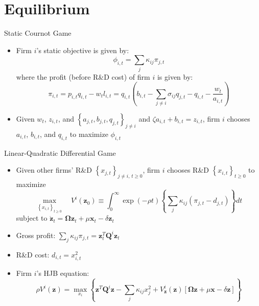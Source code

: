\documentclass[
  10pt,
  aspectratio=169,   %
]{beamer}
\theoremstyle{plain}
\begin{document}
\section{Equilibrium}

\begin{frame}{Static Cournot Game}
  \label{static_game}
  \begin{itemize}
    \item Firm $i$'s static objective is given by:
          \[
            \phi_{i,t} = \sum_{j} \kappa_{ij} \pi_{j,t}
          \]
          where the profit (before R\&D cost) of firm $i$ is given by:
          \[\pi_{i,t} = p_{i,t} q_{i,t} - w_t l_{i,t} = q_{i,t} \left( b_{i,t} - \sum_{j\neq i} \sigma_{ij} q_{j,t} - q_{i,t} - \frac{w_t}{a_{i,t}} \right)\]
    \item Given $w_t$, $z_{i,t}$, and $\left\{a_{j,t}, b_{j,t}, q_{j,t}\right\}_{j\neq i}$ and $\zeta a_{i,t} + b_{i,t} = z_{i,t}$, firm $i$ chooses $a_{i,t}$, $b_{i,t}$, and $q_{i,t}$ to maximize $\phi_{i,t}$
  \end{itemize}
  \hyperlink{static_equilibrium}{}
\end{frame}

\begin{frame}{Linear-Quadratic Differential Game}
  \begin{itemize}
    \item Given other firms' R\&D $\left\{ x_{j,t}\right\}_{j\neq i,\,t\geq0}$, firm $i$ chooses R\&D $\left\{ x_{i,t}\right\}_{t\geq0}$ to maximize
          \[
            \max_{\left\{ x_{i,t}\right\}_{t\geq0}}\quad V^{i}\left(\bm{z}_{0}\right)\equiv\int_{0}^{\infty}\exp\left(-\rho t\right)\left\{ \sum_{j}\kappa_{ij}\left(\pi_{j,t}-d_{j,t}\right)\right\} dt
          \]
          subject to $\dot{\bm{z}}_{t}=\bm{\Omega}\bm{z}_{t}+\mu\bm{x}_{t}-\delta\bm{z}_{t}$
          \pause\medskip{}
    \item Gross profit: $\sum_{j}\kappa_{ij}\pi_{j,t}=\bm{z}_{t}^{T}\bm{Q}^{i}\bm{z}_{t}$ \hyperlink{Q}{} \medskip{}
    \item R\&D cost: $d_{i,t}=x_{i,t}^2$\medskip{} \pause
    \item Firm $i$'s HJB equation:
          \[
            \rho V^{i}\left(\bm{z}\right)=\max_{x_{i}}\left\{ \bm{z}^{T}\bm{Q}^{i}\bm{z}-\sum_{j}\kappa_{ij}x_{j}^{2}+V_{\bm{z}}^{i}\left(\bm{z}\right)\left[\bm{\Omega}\bm{z}+\mu\bm{x} - \delta\bm{z} \right]\right\}
          \]
  \end{itemize}
\end{frame}
\end{document}

